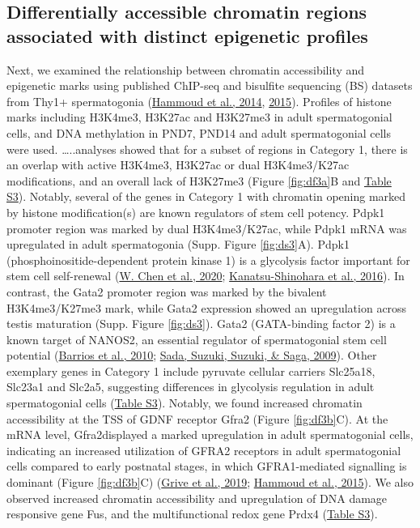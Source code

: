 \documentclass[12pt,twoside]{reedthesis}
\begin{document}
\hypertarget{differentially-accessible-chromatin-regions-associated-with-distinct-epigenetic-profiles}{%
\subsection{Differentially accessible chromatin regions associated with distinct epigenetic profiles}\label{differentially-accessible-chromatin-regions-associated-with-distinct-epigenetic-profiles}}

Next, we examined the relationship between chromatin accessibility and
epigenetic marks using published ChIP-seq and bisulfite sequencing (BS)
datasets from Thy1+ spermatogonia (\protect\hyperlink{ref-hammoud2014}{Hammoud et al., 2014}, \protect\hyperlink{ref-hammoud2015}{2015}). Profiles
of histone marks including H3K4me3, H3K27ac and H3K27me3 in adult
spermatogonial cells, and DNA methylation in PND7, PND14 and adult
spermatogonial cells were used. \ldots..analyses showed that for a subset
of regions in Category 1, there is an overlap with active H3K4me3,
H3K27ac or dual H3K4me3/K27ac modifications, and an overall lack of
H3K27me3 (Figure \ref{fig:df3a}B and \protect\hyperlink{st}{Table S3}). Notably, several of the genes in
Category 1 with chromatin opening marked by histone modification(s) are
known regulators of stem cell potency. Pdpk1 promoter region was marked
by dual H3K4me3/K27ac, while Pdpk1 mRNA was upregulated in adult
spermatogonia (Supp. Figure \ref{fig:ds3}A). Pdpk1 (phosphoinositide-dependent protein
kinase 1) is a glycolysis factor important for stem cell self-renewal
(\protect\hyperlink{ref-chen2020}{W. Chen et al., 2020}; \protect\hyperlink{ref-kanatsu-shinohara2016}{Kanatsu-Shinohara et al., 2016}). In contrast, the Gata2 promoter
region was marked by the bivalent H3K4me3/K27me3 mark, while Gata2
expression showed an upregulation across testis maturation (Supp. Figure \ref{fig:ds3}).
Gata2 (GATA-binding factor 2) is a known target of NANOS2, an essential
regulator of spermatogonial stem cell potential (\protect\hyperlink{ref-barrios2010}{Barrios et al., 2010}; \protect\hyperlink{ref-sada2009}{Sada, Suzuki, Suzuki, \& Saga, 2009}). Other exemplary genes in Category 1 include pyruvate
cellular carriers Slc25a18, Slc23a1 and Slc2a5, suggesting differences
in glycolysis regulation in adult spermatogonial cells (\protect\hyperlink{st}{Table S3}).
Notably, we found increased chromatin accessibility at the TSS of GDNF
receptor Gfra2 (Figure \ref{fig:df3b}C). At the mRNA level, Gfra2displayed a marked
upregulation in adult spermatogonial cells, indicating an increased
utilization of GFRA2 receptors in adult spermatogonial cells compared to
early postnatal stages, in which GFRA1-mediated signalling is dominant
(Figure \ref{fig:df3b}C) (\protect\hyperlink{ref-grive2019}{Grive et al., 2019}; \protect\hyperlink{ref-hammoud2015}{Hammoud et al., 2015}). We also observed increased
chromatin accessibility and upregulation of DNA damage responsive gene
Fus, and the multifunctional redox gene Prdx4 (\protect\hyperlink{st}{Table S3}).
\end{document}
